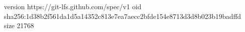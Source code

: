version https://git-lfs.github.com/spec/v1
oid sha256:1d38b2f561da1d5a14352c813e7ea7aecc2bfde154e8713d3d8b023b19badffd
size 21768
